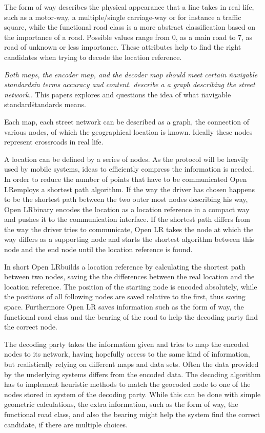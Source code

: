 The form of way describes the physical appearance that a line takes in real life, such as a motor-way, a multiple/single carriage-way or for instance a traffic square, while the functional road class is a more abstract classification based on the importance of a road. Possible values range from 0, as a main road to 7, as road of unknown or less importance. These attributes help to find the right candidates when trying to decode the location reference.

\emph{Both maps, the encoder map, and the decoder map should meet certain \"navigable standards\" in terms accuracy and content.  describe a a graph describing the street network.}. This papers explores and questions the idea of what \"navigable standard\" standards means.

Each map, each street network can be described as a graph, the connection of various nodes, of which the geographical location is known. Ideally these nodes represent crossroads in real life.

A location can be defined by a series of nodes. As the protocol will be heavily used by mobile systems, ideas to efficiently compress the information is needed. In order to reduce the number of points that have to be communicated Open LR\tm employs a shortest path algorithm. If the way the driver has chosen happens to be the shortest path between the two outer most nodes describing his way, Open LR\tm binary encodes the location as a location reference in a compact way and pushes it to the communication interface. If the shortest path differs from the way the driver tries to communicate, Open LR takes the node at which the way differs as a supporting node and starts the shortest algorithm between this node and the end node until the location reference is found.

In short Open LR\tm builds a location reference by calculating the shortest path between two nodes, saving the the differences between the real location and the location reference. The position of the  starting node is encoded absolutely, while the positions of all following nodes are saved relative to the first, thus saving space. Furthermore Open LR saves information such as the form of way, the functional road class and the bearing of the road to help the decoding party find the correct node.

The decoding party takes the information given and tries to map the encoded nodes to its network, having hopefully access to the same kind of information, but realistically relying on different maps and data sets. Often the data provided by the underlying systems differs from the encoded data. The decoding algorithm has to implement heuristic methods to match the geocoded node to one of the nodes stored in system of the decoding party. While this can be done with simple geometric calculations, the extra information, such as the form of way, the functional road class, and also the bearing might help the system find the correct candidate, if there are multiple choices.

